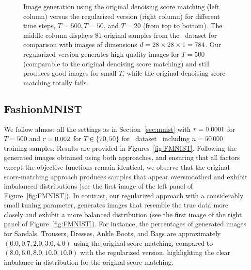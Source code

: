 \begin{figure*}[htbp]
   
    
    \caption{
    Image generation using the original denoising score matching (left column) versus the regularized version (right column) for different time steps, 
$T=500,T=50$, and $T=20$ (from top to bottom). The middle column displays $81 $ original samples from the \mnist~dataset for comparison with images of dimensions  $\textcolor{black}{d}=28\times28\times 1=784$. 
Our regularized version  generates high-quality images for  
$T=500$ (comparable to the original denoising score matching) and still produces good images for small $T$, while the original denoising score matching totally fails. 
}
    \label{fig:MNIST}
\end{figure*}




\subsection{FashionMNIST}\label{sec:fmnist}
We follow almost all the settings as in Section~\ref{sec:mnist} with $\textcolor{black}{r}=0.0001$ for $T=500$ and $\textcolor{black}{r}=0.002$ for $T\in \{70,50\}$ for \fmnist~dataset~\citep{Xiao2017} including $n=50\,000$ training samples.  
Results are provided in Figures~\ref{fig:FMNIST}. 
Following the generated images obtained using both approaches, and ensuring that all factors except the objective functions remain identical, we observe that the original score-matching approach produces samples that appear oversmoothed and exhibit imbalanced distributions (see the first image of the left panel of Figure~\ref{fig:FMNIST}).  
In contrast, our regularized approach with a considerably small tuning parameter, generates images that resemble the true data more closely and exhibit a more balanced distribution (see the first image of the right panel of Figure~\ref{fig:FMNIST}). 
For instance, the percentages of generated images for Sandals, Trousers, Dresses, Ankle Boots, and Bags are approximately $(0.0, 0.7, 2.0, 3.0, 4.0)$ using the original score matching, compared to $(8.0, 6.0, 8.0, 10.0, 10.0)$ with the regularized version, highlighting the clear imbalance in distribution for the original score matching.




